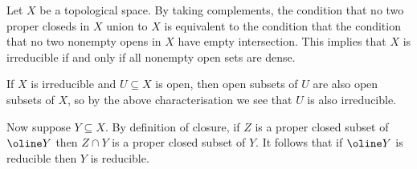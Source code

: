 \begin{nothing}
  Let $X$ be a topological space. By taking complements, the condition
  that no two proper closeds in $X$ union to $X$ is equivalent to the
  condition that the condition that no two nonempty opens in $X$ have
  empty intersection. This implies that $X$ is irreducible if and only
  if all nonempty open sets are dense.

  If $X$ is irreducible and $U \subseteq X$ is open, then open subsets
  of $U$ are also open subsets of $X$, so by the above
  characterisation we see that $U$ is also irreducible.

  \medskip\noindent
  Now suppose $Y \subseteq X$. By definition of closure, if $Z$ is a
  proper closed subset of $\oline Y$ then $Z \cap Y$ is a proper
  closed subset of $Y$. It follows that if $\oline Y$ is reducible
  then $Y$ is reducible.
\end{nothing}

\renewcommand{\Y}{\mathcal{Y}}

